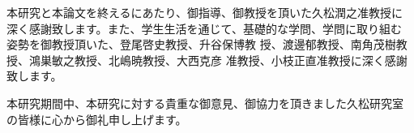 \acknowledgment
本研究と本論文を終えるにあたり、御指導、御教授を頂いた久松潤之准教授に
深く感謝致します。また、学生生活を通じて、基礎的な学問、学問に取り組む
姿勢を御教授頂いた、登尾啓史教授、升谷保博教
授、渡邊郁教授、南角茂樹教授、鴻巣敏之教授、北嶋暁教授、大西克彦
准教授、小枝正直准教授に深く感謝致します。

本研究期間中、本研究に対する貴重な御意見、御協力を頂きました久松研究室
の皆様に心から御礼申し上げます。
